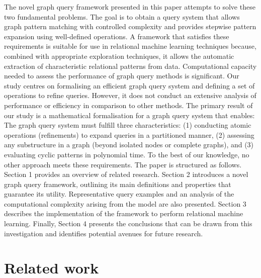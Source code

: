 \documentclass{article}%
\begin{document}
\newline%
The novel graph query framework presented in this paper attempts to solve these two fundamental problems. The goal is to obtain a query system that allows graph pattern matching with controlled complexity and provides stepwise pattern expansion using well{-}defined operations. A framework that satisfies these requirements is suitable for use in relational machine learning techniques because, combined with appropriate exploration techniques, it allows the automatic extraction of characteristic relational patterns from data.\newline%
\newline%
Computational capacity needed to assess the performance of graph query methods is significant. Our study centres on formalising an efficient graph query system and defining a set of operations to refine queries. However, it does not conduct an extensive analysis of performance or efficiency in comparison to other methods. The primary result of our study is a mathematical formalisation for a graph query system that enables: The graph query system must fulfill three characteristics: (1) conducting atomic operations (refinements) to expand queries in a partitioned manner, (2) assessing any substructure in a graph (beyond isolated nodes or complete graphs), and (3) evaluating cyclic patterns in polynomial time. To the best of our knowledge, no other approach meets these requirements.\newline%
\newline%
The paper is structured as follows. Section 1 provides an overview of related research. Section 2 introduces a novel graph query framework, outlining its main definitions and properties that guarantee its utility. Representative query examples and an analysis of the computational complexity arising from the model are also presented. Section 3 describes the implementation of the framework to perform relational machine learning. Finally, Section 4 presents the conclusions that can be drawn from this investigation and identifies potential avenues for future research.

%
\clearpage%
\section{Related work}%
\label{sec:Relatedwork}%
\end{document}
